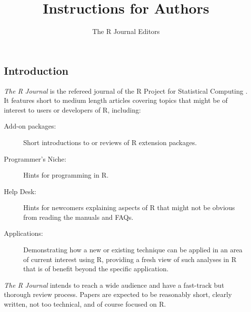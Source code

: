 \documentclass[a4paper]{report}
\begin{document}
\fancyhf{}
\fancyhead[RO,LE]{\thepage}

\begin{article}
\title{Instructions for Authors}

\author{The R Journal Editors}

\maketitle


\section{Introduction}

\emph{The R Journal} is the refereed journal of the R Project for Statistical
Computing \citep{R:Ihaka+Gentleman:1996}.
It features short to medium length articles covering topics
that might be of interest to users or developers of R, including:

\begin{description}

\item[Add-on packages:] Short introductions to or reviews of R extension
packages.

\item[Programmer's Niche:] Hints for programming in R.

\item[Help Desk:] Hints for newcomers explaining aspects of R that might
  not be obvious from reading the manuals and FAQs.

\item[Applications:] Demonstrating how a new or existing technique can be
applied in an area of current interest using R, providing a fresh view
of such analyses in R that is of benefit beyond the specific application.

\end{description}

\emph{The R Journal} intends to reach a wide audience and have a fast-track
but thorough review process. Papers are expected to be reasonably short,
clearly written, not too technical, and of course focused on R.


\end{article}
\end{document}
